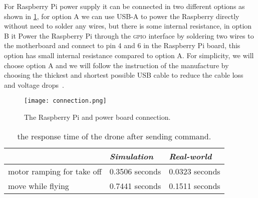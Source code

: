 \documentclass[../main.tex]{subfiles}
\begin{document}
For Raspberry Pi power supply it can be connected in 
two different options as shown in \cref{fig:connection}, 
for option A we can use USB-A to power the Raspberry directly without
need to solder any wires,
but there is some internal resistance,
in option B it Power the Raspberry Pi through the \textsc{gpio} 
interface by soldering two wires to the motherboard and 
connect to pin 4 and 6 in the Raspberry Pi board,
this option has small internal resistance compared to option A.
For simplicity, we will choose option A and we will 
follow the instruction of the manufacture by choosing 
the thickest and shortest possible USB cable to reduce 
the cable loss and voltage drops~\cite{makerfocus}. 	 
 
 \begin{figure}[h]
 	\centering
 	\texttt{[image: connection.png]}
 	\caption{The Raspberry Pi and power board connection.}
 	\label{fig:connection}
 \end{figure}   

\begin{table}[H]
	\centering
	\caption{the response time of the drone after sending command.}
	\label{tab:respone-time}
	\begin{tabular}{ p{6cm} p{4cm} p{4cm} }
		\toprule
		\textit{} & \textit{Simulation} & \textit{Real-world}\\ \midrule
		motor ramping for take off  & 0.3506 seconds & 0.0323 seconds    \\
		move while flying & 0.7441 seconds & 0.1511 seconds  \\
		\bottomrule
	\end{tabular}
\end{table} 
\end{document}
